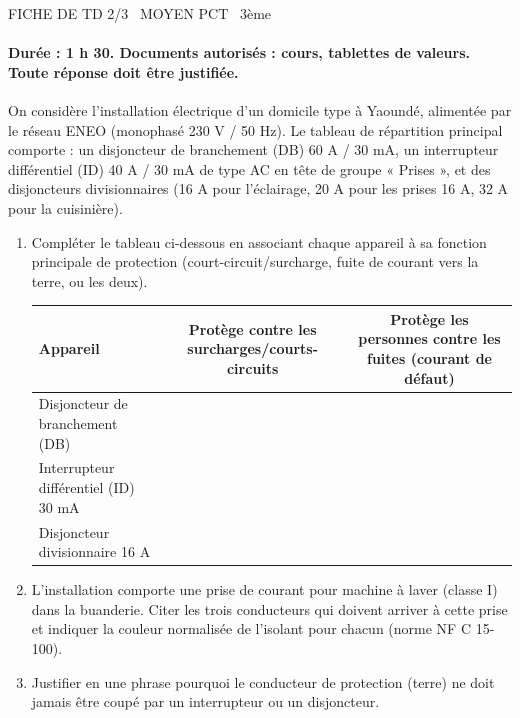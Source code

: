 \documentclass[11pt]{article}
\begin{document}
\begin{tcolorbox}[enhanced,colback=popink,colframe=popink,arc=10pt,boxrule=0pt,left=12pt,right=12pt,top=9pt,bottom=9pt]
{\color{white}\popxbold\small FICHE DE TD 2/3 \textbullet\ MOYEN \hfill PCT \textbullet\ 3ème\par}
\end{tcolorbox}
\vspace{4pt}
\paragraph{Durée : 1 h 30. Documents autorisés : cours, tablettes de valeurs. Toute réponse doit être justifiée.}

\begin{exercice}
On considère l'installation électrique d'un domicile type à Yaoundé, alimentée par le réseau ENEO (monophasé 230 V / 50 Hz). Le tableau de répartition principal comporte : un disjoncteur de branchement (DB) 60 A / 30 mA, un interrupteur différentiel (ID) 40 A / 30 mA de type AC en tête de groupe « Prises », et des disjoncteurs divisionnaires (16 A pour l'éclairage, 20 A pour les prises 16 A, 32 A pour la cuisinière).

\begin{enumerate}
    \item Compléter le tableau ci-dessous en associant chaque appareil à sa fonction principale de protection (court-circuit/surcharge, fuite de courant vers la terre, ou les deux).
    \begin{tabular}{|l|c|c|}
    \hline
    Appareil & Protège contre les surcharges/courts-circuits & Protège les personnes contre les fuites (courant de défaut) \\
    \hline
    Disjoncteur de branchement (DB) & & \\
    \hline
    Interrupteur différentiel (ID) 30 mA & & \\
    \hline
    Disjoncteur divisionnaire 16 A & & \\
    \hline
    \end{tabular}
    \item L'installation comporte une prise de courant pour machine à laver (classe I) dans la buanderie. Citer les trois conducteurs qui doivent arriver à cette prise et indiquer la couleur normalisée de l'isolant pour chacun (norme NF C 15-100).
    \item Justifier en une phrase pourquoi le conducteur de protection (terre) ne doit jamais être coupé par un interrupteur ou un disjoncteur.
\end{enumerate}
\end{exercice}
\end{document}
